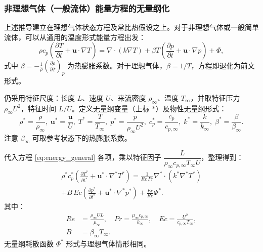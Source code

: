\documentclass[12pt, a4paper, oneside, UTF8]{ctexbook}  %
\begin{document}



\subsubsection*{非理想气体（一般流体）能量方程的无量纲化}
上述推导建立在理想气体状态方程及常比热假设之上。对于非理想气体或一般简单流体，可以从通用的温度形式能量方程出发：
\begin{equation}
    \rho c_p \left( \frac{\partial T}{\partial t} + \mathbf{u}\cdot\nabla T \right) = \nabla \cdot (k \nabla T) + \beta T \left( \frac{\partial p}{\partial t} + \mathbf{u}\cdot\nabla p \right) + \Phi ,
    \label{eq:energy_general}
\end{equation}
式中 $\beta = -\frac{1}{\rho}\left(\frac{\partial \rho}{\partial T}\right)_p$ 为热膨胀系数。对于理想气体，$\beta = 1/T$，方程即退化为前文形式。

仍采用特征尺度：长度 $L$、速度 $U$、来流密度 $\rho_\infty$、温度 $T_\infty$，并取特征压力 $\rho_\infty U^2$，特征时间 $L/U$。定义无量纲变量（上标 $*$）及物性无量纲形式：
\[
\rho^* = \frac{\rho}{\rho_\infty},\; \mathbf{u}^* = \frac{\mathbf{u}}{U},\; T^* = \frac{T}{T_\infty},\; p^* = \frac{p}{\rho_\infty U^2},\; c_p^* = \frac{c_p}{c_{p,\infty}},\; k^* = \frac{k}{k_\infty},\; \beta^* = \frac{\beta}{\beta_\infty}.
\]
注意 $\beta_\infty$ 可取参考状态下的热膨胀系数。

代入方程 \eqref{eq:energy_general} 各项，乘以特征因子 $\dfrac{L}{\rho_\infty c_{p,\infty} T_\infty U}$，整理得到：
\begin{multline}
    \rho^* c_p^* \left( \frac{\partial T^*}{\partial t^*} + \mathbf{u}^* \cdot \nabla^* T^* \right) 
    = \frac{1}{Re\,Pr} \nabla^* \cdot (k^* \nabla^* T^*) \\
    + B\,Ec \left( \frac{\partial p^*}{\partial t^*} + \mathbf{u}^* \cdot \nabla^* p^* \right) 
    + \frac{Ec}{Re} \Phi^* .
    \label{eq:energy_nondim_general}
\end{multline}
其中：
\begin{align*}
    Re &= \frac{\rho_\infty U L}{\mu_\infty}, \quad 
    Pr = \frac{\mu_\infty c_{p,\infty}}{k_\infty}, \quad 
    Ec = \frac{U^2}{c_{p,\infty} T_\infty},\\
    B &= \beta_\infty T_\infty .
\end{align*}
无量纲耗散函数 $\Phi^*$ 形式与理想气体情形相同。
\end{document}
